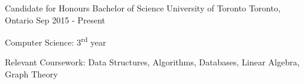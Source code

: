 \newcommand{\ts}{\textsuperscript}

\begin{cventries}
  \cventry
    {Candidate for Honours Bachelor of Science}
    {University of Toronto}
    {Toronto, Ontario}
    {Sep 2015 - Present}
    {
      \begin{cvitems}
        \item {Computer Science: 3\ts{rd} year}
        \item Relevant Coursework: Data Structures, Algorithms, Databases, Linear Algebra, Graph Theory
      \end{cvitems}
    }

\end{cventries}
